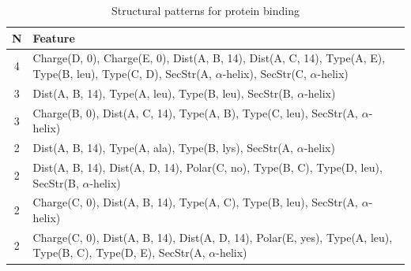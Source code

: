 \documentclass[11pt,twoside,a4paper]{book}
\begin{document}
\begin{table}\begin{tabularx}{\textwidth}{cX}\textbf{N} & \textbf{Feature} \\ \hline  
4 & Charge(D, 0), Charge(E, 0), Dist(A, B, 14), Dist(A, C, 14),  Type(A, E), \newline Type(B, leu), Type(C, D), SecStr(A, $\alpha$-helix), SecStr(C, $\alpha$-helix)\\ \hline 
3 & Dist(A, B, 14),  Type(A, leu), Type(B, leu), SecStr(B, $\alpha$-helix)\\ \hline 
3 & Charge(B, 0), Dist(A, C, 14),  Type(A, B), Type(C, leu), SecStr(A, $\alpha$-helix)\\ \hline 
2 & Dist(A, B, 14),  Type(A, ala), Type(B, lys), SecStr(A, $\alpha$-helix)\\ \hline 
2 & Dist(A, B, 14), Dist(A, D, 14), Polar(C, no),  Type(B, C), Type(D, leu), \newline SecStr(B, $\alpha$-helix)\\ \hline 
2 & Charge(C, 0), Dist(A, B, 14),  Type(A, C), Type(B, leu), SecStr(A, $\alpha$-helix)\\ \hline 
2 & Charge(C, 0), Dist(A, B, 14), Dist(A, D, 14), Polar(E, yes),  Type(A, leu), \newline Type(B, C), Type(D, E), SecStr(A, $\alpha$-helix)\\ \hline 
 \end{tabularx}\caption{Structural patterns for protein binding}\label{tab:protein_binding}\end{table}
\end{document}
